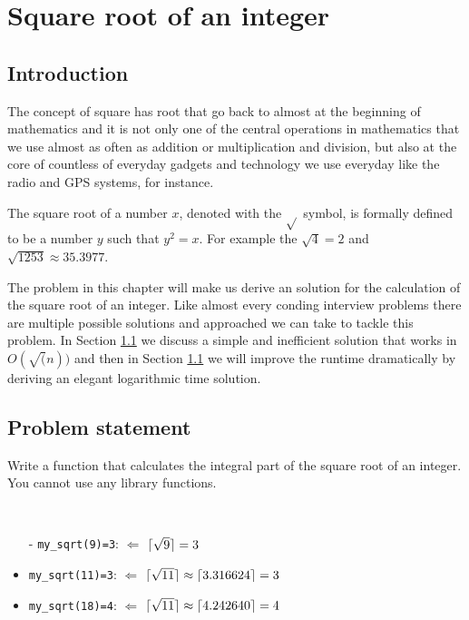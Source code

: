 %


\chapter{Square root of an integer}
\label{ch:square_root}
\section*{Introduction}
The concept of square has root that go back to almost at the beginning of mathematics and it is not only one of the central operations in mathematics that
we use almost as often as addition or multiplication and division, but also at the core of countless of everyday gadgets and technology we use everyday like the radio and GPS systems, for instance.

The square root of a number $x$, denoted with the $\sqrt{}$ symbol, is formally defined to be a number $y$ such that $y^2 = x$.
For example the $\sqrt{4} = 2$ and $\sqrt{1253} \approx 35.3977$.

The problem in this chapter will make us derive an solution for the calculation of the square root of an integer.
Like almost every conding interview problems there are multiple possible solutions and approached we can take to tackle this problem. 
In Section \ref{} we discuss a simple and inefficient solution that works in $O(\sqrt(n))$
and then in Section \ref{} we will improve the runtime dramatically by deriving an elegant logarithmic time solution.

\section{Problem statement}
	\begin{exercise}
	Write a function that calculates the integral part of the square root of an integer.
	You cannot use any library functions.
	
	\begin{example}
		\hfill \\
		\begin{itemize}
			\item[-] 	\lstinline[columns=fixed]{my_sqrt(9)=3}: $\Longleftarrow $ $\lceil\sqrt{9}\rceil=3$
			\item[-] 	\lstinline[columns=fixed]{my_sqrt(11)=3}: $\Longleftarrow $
			$\lceil\sqrt{11}\rceil\approx\lceil3.316624\rceil=3$
			\item[-] 	\lstinline[columns=fixed]{my_sqrt(18)=4}: $\Longleftarrow $
			$\lceil\sqrt{11}\rceil\approx\lceil4.242640\rceil=4$
		\end{itemize}

	\end{example}
\end{exercise}
